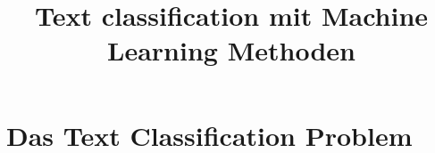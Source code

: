 \documentclass[12pt,a4paper,twoside]{article}
\begin{document}
\title{Text classification mit Machine Learning Methoden}
\maketitle

\section{Das Text Classification Problem}
\label{sec:problem}
\end{document}
